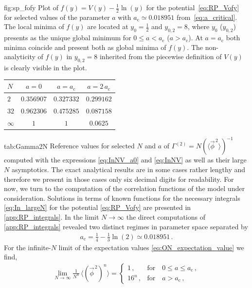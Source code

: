 	{fig:sp_fofy} %
	{%
		Plot of ${f ( y ) = V ( y ) - \tfrac{1}{2} \ln ( y )}$ for the potential~\eqref{eq:RP_Vofy} for selected values of the parameter $a$ \dash{} with ${a_\mathrm{c}\simeq 0.018951}$ from~\cref{eq:a_critical}. The local minima of $f ( y )$ are located at $y_0 = \tfrac{1}{2}$ and $y_{0, 2} = 8$, where $y_0$ ($y_{0, 2}$) presents as the unique global minimum for $0 \leq a < a_\mathrm{c}$ ($a > a_\mathrm{c}$). At $a = a_\mathrm{c}$ both minima coincide and present both as global minima of $f ( y )$. The non-analyticity of $f ( y )$ in $y_{0, 2} = 8$ inherited from the piecewise definition of $V ( y )$ is clearly visible in the plot.
	} %
	{%
		\renewcommand{\arraystretch}{1.15}
		\small
		\begin{tabular}{l | c c c}
			\toprule
			$N$			&	$a = 0$		&	$a = a_\mathrm{c}$	&	$a = 2\, a_\mathrm{c}$\\
			\midrule
			$2$			&	$0.356907$	&	$0.327332$ 			&	$0.299162$\\
			$32$		&	$0.962306$	&	$0.475285$			&	$0.087158$\\
			$\infty$	&	 $1$		&	$1$					&	$0.0625$\\
			\bottomrule
		\end{tabular}
	} %
	{tab:Gamma2N}%
	{%
		Reference values for selected $N$ and $a$ of ${\Gamma^{(2)} = N ( \langle \vec{\phi}^{\, 2} \rangle )^{- 1}}$ computed with the expressions \eqref{eq:InNV_a0} and \eqref{eq:InNV} as well as their large $N$ asymptotics.
		The exact analytical results are in some cases rather lengthy and therefore we present in those cases only six decimal digits for readability.
	} %
For now, we turn to the computation of the correlation functions of the model under consideration.
Solutions in terms of known functions for the necessary integrals \eqref{eq:In_largeN} for the potential \eqref{eq:RP_Vofy} are presented in \cref{app:RP_integrals}.
In the limit ${N \rightarrow \infty}$ the direct computations of \cref{app:RP_integrals} revealed two distinct regimes in parameter space separated by
\begin{align}
	a_\mathrm{c} = \tfrac{1}{4} - \tfrac{1}{3} \ln ( 2 ) \simeq 0.018951 \, .	\label{eq:a_critical}
\end{align}
For the infinite-$N$ limit of the expectation values \eqref{eq:ON_expectation_value} we find,
\begin{align}
	\lim_{N \rightarrow \infty} \tfrac{1}{N^n} \, \big\langle ( \vec{\phi}^{\, 2} )^n \big\rangle =
	\begin{cases}
		1 \, ,		&	\text{for} \quad 0 \leq a \leq a_\mathrm{c} \, ,\\
		16^n \, ,	&	\text{for} \quad a>a_\mathrm{c} \, ,
	\end{cases}
\end{align}
